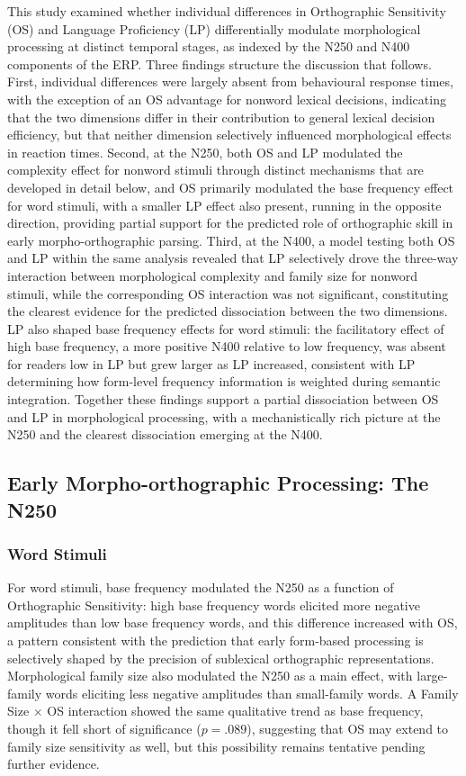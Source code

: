 \documentclass[utf8]{FrontiersinHarvard} %
\begin{document}
	This study examined whether individual differences in Orthographic Sensitivity (OS) and Language Proficiency (LP) differentially modulate morphological processing at distinct temporal stages, as indexed by the N250 and N400 components of the ERP. Three findings structure the discussion that follows. First, individual differences were largely absent from behavioural response times, with the exception of an OS advantage for nonword lexical decisions, indicating that the two dimensions differ in their contribution to general lexical decision efficiency, but that neither dimension selectively influenced morphological effects in reaction times. Second, at the N250, both OS and LP modulated the complexity effect for nonword stimuli through distinct mechanisms that are developed in detail below, and OS primarily modulated the base frequency effect for word stimuli, with a smaller LP effect also present, running in the opposite direction, providing partial support for the predicted role of orthographic skill in early morpho-orthographic parsing. Third, at the N400, a model testing both OS and LP within the same analysis revealed that LP selectively drove the three-way interaction between morphological complexity and family size for nonword stimuli, while the corresponding OS interaction was not significant, constituting the clearest evidence for the predicted dissociation between the two dimensions. LP also shaped base frequency effects for word stimuli: the facilitatory effect of high base frequency, a more positive N400 relative to low frequency, was absent for readers low in LP but grew larger as LP increased, consistent with LP determining how form-level frequency information is weighted during semantic integration. Together these findings support a partial dissociation between OS and LP in morphological processing, with a mechanistically rich picture at the N250 and the clearest dissociation emerging at the N400.
	
	\subsection{Early Morpho-orthographic Processing: The N250}
	
	\subsubsection{Word Stimuli}
	
	For word stimuli, base frequency modulated the N250 as a function of Orthographic Sensitivity: high base frequency words elicited more negative amplitudes than low base frequency words, and this difference increased with OS, a pattern consistent with the prediction that early form-based processing is selectively shaped by the precision of sublexical orthographic representations. Morphological family size also modulated the N250 as a main effect, with large-family words eliciting less negative amplitudes than small-family words. A Family Size $\times$ OS interaction showed the same qualitative trend as base frequency, though it fell short of significance ($p = .089$), suggesting that OS may extend to family size sensitivity as well, but this possibility remains tentative pending further evidence.
	
\end{document}
